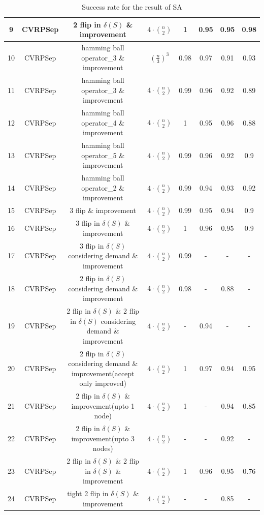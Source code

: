 \documentclass[11pt]{article}
\begin{document}
\begin{spacing}{1.5}
\begin{table}[!htb]
{\begin{tabular}{|c|c|c|c|c|c|c|c|}
9  & CVRPSep          & 2 flip in $\delta(S)$ \& improvement             & $4\cdot \binom n2$   & 1 & 0.95&  0.95 &  0.98 \\ \hline
10 & CVRPSep & hamming ball operator\_3 \& improvement                                     & $(\frac{n}{3})^3$ &0.98  &0.97 & 0.91  &0.93   \\ \hline
11 & CVRPSep          & hamming ball operator\_3 \& improvement                & $4\cdot \binom n2$   &0.99  &0.96 &0.92   &0.89   \\ \hline
12 & CVRPSep          & hamming ball operator\_4 \& improvement                & $4\cdot \binom n2$   &1  &0.95 &0.96   & 0.88  \\ \hline
13 & CVRPSep          & hamming ball operator\_5 \& improvement                & $4\cdot \binom n2$   &0.99  &0.96 &0.92   & 0.9  \\ \hline
14 & CVRPSep          & hamming ball operator\_2 \& improvement                & $4\cdot \binom n2$   &0.99  &0.94 &0.93   &0.92   \\ \hline
15 & CVRPSep          & 3 flip \& improvement                            & $4\cdot \binom n2$   &0.99  & 0.95& 0.94  & 0.9  \\ \hline
16 & CVRPSep          & 3 flip in $\delta(S)$ \& improvement               & $4\cdot \binom n2$   &1  &0.96 & 0.95  & 0.9  \\ \hline
17 & CVRPSep          & 3 flip in $\delta(S)$ considering demand \& improvement & $4\cdot \binom n2$  &0.99  &- &-   &-   \\ \hline
18 & CVRPSep          & 2 flip in $\delta(S)$ considering demand \& improvement & $4\cdot \binom n2$   &0.98  &- &0.88   &-   \\ \hline
19 & CVRPSep & 2 flip in $\delta(S)$ \& 2 flip in $\delta(S)$ considering demand \& improvement & $4\cdot \binom n2$   &-  &0.94 &-   &-   \\ \hline
20 & CVRPSep & 2 flip in $\delta(S)$ considering demand \& improvement(accept only improved)                         & $4\cdot \binom n2$ &1  &0.97 &0.94   &0.95   \\ \hline
21 & CVRPSep          & 2 flip in $\delta(S)$ \& improvement(upto 1 node)       & $4\cdot \binom n2$  &1  &- & 0.94  &0.85   \\ \hline
22 & CVRPSep          & 2 flip in $\delta(S)$ \& improvement(upto 3 nodes)       & $4\cdot \binom n2$  &- &- &0.92   &-   \\ \hline
23 & CVRPSep & 2 flip in $\delta(S)$ \& 2 flip in $\delta(S)$ \& improvement               & $4\cdot \binom n2$  &1  &0.96 &0.95   &0.76   \\ \hline
24 & CVRPSep          & tight 2 flip in $\delta(S)$ \& improvement       & $4\cdot \binom n2$  &-  &- &0.85   &-   \\ \hline
\end{tabular}%
}
\caption{Success rate for the result of SA}
\end{table}


\end{spacing}
\end{document}

